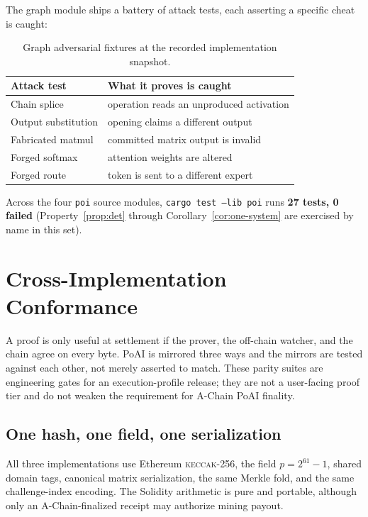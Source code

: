 \documentclass[11pt,a4paper]{article}
\begin{document}
The graph module ships a battery of attack tests, each asserting a specific cheat is caught:

\begin{table}[h]
\centering
\begin{tabular}{p{}p{}}
\toprule
\textbf{Attack test} & \textbf{What it proves is caught} \\
\midrule
Chain splice & operation reads an unproduced activation \\
Output substitution & opening claims a different output \\
Fabricated matmul & committed matrix output is invalid \\
Forged softmax & attention weights are altered \\
Forged route & token is sent to a different expert \\
\bottomrule
\end{tabular}
\caption{Graph adversarial fixtures at the recorded implementation snapshot.}
\end{table}

Across the four \texttt{poi} source modules, \texttt{cargo test --lib poi} runs \textbf{27 tests, 0 failed} (Property~\ref{prop:det} through Corollary~\ref{cor:one-system} are exercised by name in this set).

\section{Cross-Implementation Conformance}\label{sec:parity}

A proof is only useful at settlement if the prover, the off-chain watcher, and the chain agree on every byte. PoAI is mirrored three ways and the mirrors are tested against each other, not merely asserted to match. These parity suites are engineering gates for an execution-profile release; they are not a user-facing proof tier and do not weaken the requirement for A-Chain PoAI finality.

\subsection{One hash, one field, one serialization}

All three implementations use Ethereum \textsc{keccak}-256, the field $p=2^{61}-1$, shared domain tags, canonical matrix serialization, the same Merkle fold, and the same challenge-index encoding. The Solidity arithmetic is pure and portable, although only an A-Chain-finalized receipt may authorize mining payout.
\end{document}
